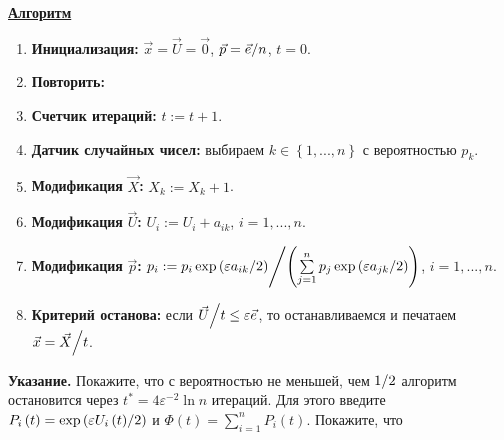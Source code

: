 \begin{problem}
\underline {\textbf{Алгоритм}}

\begin{enumerate}
\item \textbf{Инициализация:} $\vec {x}=\vec {U}=\vec {0}$, $\vec {p}={\vec {e}} \mathord{\left/ {\vphantom {{\vec {e}} n}} \right. \kern-\nulldelimiterspace} n$, $t=0$.
\item \textbf{Повторить:}
\item \textbf{Счетчик итераций: }$t:=t+1$.
\item \textbf{Датчик случайных чисел:} выбираем $k\in \left\{ {1,...,n} \right\}$ с вероятностью $p_k $.
\item \textbf{Модификация }$\vec {X}$\textbf{: }$X_k :=X_k +1$.
\item \textbf{Модификация }$\vec {U}$\textbf{:} $U_i :=U_i +a_{ik} $, $i=1,...,n$.
\item \textbf{Модификация }$\vec {p}$\textbf{:} $p_i :={p_i \exp \left( {\varepsilon {a_{ik} } \mathord{\left/ {\vphantom {{a_{ik} } 2}} \right. \kern-\nulldelimiterspace} 2} \right)} \mathord{\left/ {\vphantom {{p_i \exp \left( {\varepsilon {a_{ik} } \mathord{\left/ {\vphantom {{a_{ik} } 2}} \right. \kern-\nulldelimiterspace} 2} \right)} {\left( {\sum\limits_{j=1}^n {p_j \exp \left( {\varepsilon {a_{jk} } \mathord{\left/ {\vphantom {{a_{jk} } 2}} \right. \kern-\nulldelimiterspace} 2} \right)} } \right)}}} \right. \kern-\nulldelimiterspace} {\left( {\sum\limits_{j=1}^n {p_j \exp \left( {\varepsilon {a_{jk} } \mathord{\left/ {\vphantom {{a_{jk} } 2}} \right. \kern-\nulldelimiterspace} 2} \right)} } \right)}$, $i=1,...,n$.
\item \textbf{Критерий останова:} если ${\vec {U}} \mathord{\left/ {\vphantom {{\vec {U}} t}} \right. \kern-\nulldelimiterspace} t\le 
\varepsilon \vec {e}$, то останавливаемся и печатаем ${\vec {x}=\vec {X}} \mathord{\left/ {\vphantom {{\vec {x}=\vec {X}} t}} \right. \kern-\nulldelimiterspace} t$.
\end{enumerate}
\textbf{Указание.} Покажите, что с вероятностью не меньшей, чем $1 
\mathord{\left/ {\vphantom {1 2}} \right. \kern-\nulldelimiterspace} 2$ 
алгоритм остановится через $t^\ast =4\varepsilon ^{-2}\ln n$ итераций. Для 
этого введите $P_i \left( t \right)=\exp \left( {{\varepsilon U_i \left( t 
\right)} \mathord{\left/ {\vphantom {{\varepsilon U_i \left( t \right)} 2}} 
\right. \kern-\nulldelimiterspace} 2} \right)$ и $\Phi \left( t 
\right)=\sum\limits_{i=1}^n {P_i \left( t \right)} $. Покажите, что


\end{problem}
